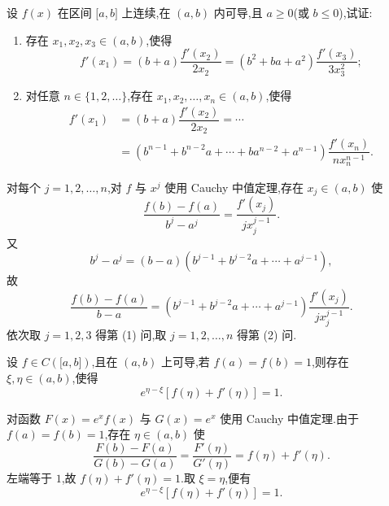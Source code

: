 \begin{example}
    设 $f(x)$ 在区间 $\lbrack a,b\rbrack$ 上连续,在 $(a,b)$ 内可导,且 $a\geq0$(或 $b\leq0$),试证:
    \begin{enumerate}
        \item 存在 $x_1,x_2,x_3\in(a,b)$,使得
              \[
                  f'(x_1)
                  =(b+a)\dfrac{f'(x_2)}{2x_2}
                  =(b^2+ba+a^2)\dfrac{f'(x_3)}{3x_3^2};
              \]
        \item 对任意 $n\in\{1,2,\ldots\}$,存在 $x_1,x_2,\ldots,x_n\in(a,b)$,使得
              \[
                  \begin{aligned}
                      f'(x_1)
                       & =(b+a)\dfrac{f'(x_2)}{2x_2}
                      =\cdots                                        \\
                       & =(b^{n-1}+b^{n-2}a+\cdots+ba^{n-2}+a^{n-1})
                      \dfrac{f'(x_n)}{nx_n^{n-1}}.
                  \end{aligned}
              \]
    \end{enumerate}
\end{example}
\exampleblank

\begin{solution}
    对每个 $j=1,2,\ldots,n$,对 $f$ 与 $x^j$ 使用 Cauchy 中值定理,存在 $x_j\in(a,b)$ 使
    \[
        \dfrac{f(b)-f(a)}{b^j-a^j}
        =\dfrac{f'(x_j)}{jx_j^{j-1}}.
    \]
    又
    \[
        b^j-a^j=(b-a)(b^{j-1}+b^{j-2}a+\cdots+a^{j-1}),
    \]
    故
    \[
        \dfrac{f(b)-f(a)}{b-a}
        =(b^{j-1}+b^{j-2}a+\cdots+a^{j-1})
        \dfrac{f'(x_j)}{jx_j^{j-1}}.
    \]
    依次取 $j=1,2,3$ 得第 (1) 问,取 $j=1,2,\ldots,n$ 得第 (2) 问.
\end{solution}

\begin{example}
    设 $f\in C(\lbrack a,b\rbrack)$,且在 $(a,b)$ 上可导,若 $f(a)=f(b)=1$,则存在 $\xi,\eta\in(a,b)$,使得
    \[
        e^{\eta-\xi}[f(\eta)+f'(\eta)]=1.
    \]
\end{example}
\exampleblank

\begin{solution}
    对函数 $F(x)=e^x f(x)$ 与 $G(x)=e^x$ 使用 Cauchy 中值定理.由于 $f(a)=f(b)=1$,存在 $\eta\in(a,b)$ 使
    \[
        \dfrac{F(b)-F(a)}{G(b)-G(a)}
        =\dfrac{F'(\eta)}{G'(\eta)}
        =f(\eta)+f'(\eta).
    \]
    左端等于 $1$,故 $f(\eta)+f'(\eta)=1$.取 $\xi=\eta$,便有
    \[
        e^{\eta-\xi}[f(\eta)+f'(\eta)]=1.
    \]
\end{solution}

